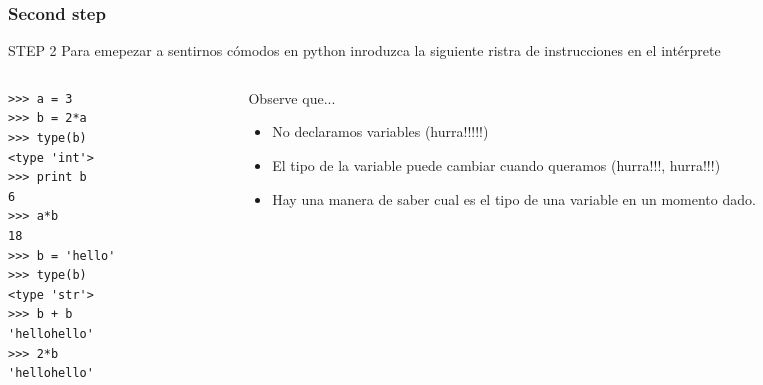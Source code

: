 \documentclass[10pt,colorlinks]{beamer}
\begin{document}
\begin{frame}[fragile]\frametitle{Second step}
\vspace{-0.1cm}
\begin{block}{\centering STEP 2}
\centering Para emepezar a sentirnos cómodos en python inroduzca la siguiente ristra de instrucciones en el intérprete
\end{block}
 \begin{columns}[T]
\begin{column}{.5\textwidth}
\tiny
\begin{verbatim}
>>> a = 3
>>> b = 2*a
>>> type(b)
<type 'int'>
>>> print b
6
>>> a*b
18
>>> b = 'hello'
>>> type(b)
<type 'str'>
>>> b + b
'hellohello'
>>> 2*b
'hellohello'
\end{verbatim}


\end{column}
    \begin{column}{.5\textwidth}
    \begin{block}{\centering Observe que...}
            \begin{itemize}
\scriptsize    
                \item No declaramos variables (hurra!!!!!) 
                \item El tipo de la variable puede cambiar cuando queramos (hurra!!!, hurra!!!)
                \item Hay una manera de saber cual es el tipo de una variable en un momento dado.
            \end{itemize}
       \end{block}

\end{column}
\end{columns}
\end{frame}
\end{document}
